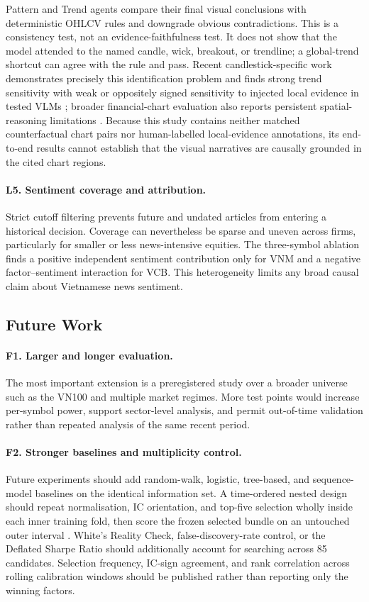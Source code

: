 Pattern and Trend agents compare their final visual conclusions with deterministic OHLCV rules and downgrade obvious contradictions. This is a consistency test, not an evidence-faithfulness test. It does not show that the model attended to the named candle, wick, breakout, or trendline; a global-trend shortcut can agree with the rule and pass. Recent candlestick-specific work demonstrates precisely this identification problem and finds strong trend sensitivity with weak or oppositely signed sensitivity to injected local evidence in tested VLMs \cite{wang2026martingale}; broader financial-chart evaluation also reports persistent spatial-reasoning limitations \cite{shu2026finchart}. Because this study contains neither matched counterfactual chart pairs nor human-labelled local-evidence annotations, its end-to-end results cannot establish that the visual narratives are causally grounded in the cited chart regions.

\paragraph{L5. Sentiment coverage and attribution.}
Strict cutoff filtering prevents future and undated articles from entering a historical decision. Coverage can nevertheless be sparse and uneven across firms, particularly for smaller or less news-intensive equities. The three-symbol ablation finds a positive independent sentiment contribution only for VNM and a negative factor--sentiment interaction for VCB. This heterogeneity limits any broad causal claim about Vietnamese news sentiment.

\subsection{Future Work}

\paragraph{F1. Larger and longer evaluation.}
The most important extension is a preregistered study over a broader universe such as the VN100 and multiple market regimes. More test points would increase per-symbol power, support sector-level analysis, and permit out-of-time validation rather than repeated analysis of the same recent period.

\paragraph{F2. Stronger baselines and multiplicity control.}
Future experiments should add random-walk, logistic, tree-based, and sequence-model baselines on the identical information set. A time-ordered nested design should repeat normalisation, IC orientation, and top-five selection wholly inside each inner training fold, then score the frozen selected bundle on an untouched outer interval \cite{varma2006bias}. White's Reality Check, false-discovery-rate control, or the Deflated Sharpe Ratio should additionally account for searching across 85 candidates. Selection frequency, IC-sign agreement, and rank correlation across rolling calibration windows should be published rather than reporting only the winning factors.

